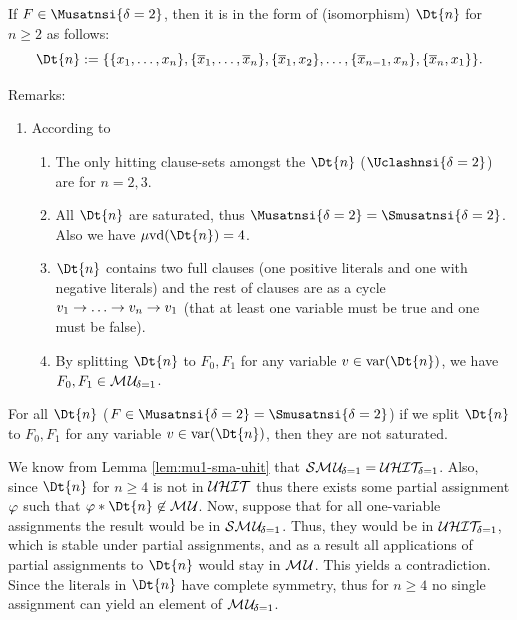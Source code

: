 \documentclass{report}
\begin{document}
\begin{lem}\label{lem:mu2-Fn}
\cite{h24} If $F \in \Musatnsi{\delta=2}$, then it is in the form of (isomorphism) $\Dt{n}$  for $n \ge 2$ as follows:
  \begin{displaymath}
    \Dt{n} := \set{\set{x_1,\dots,x_n},\set{\ol x_1,\dots,\ol x_n},\set{\ol x_1,x_2}, \dots, \set{\ol x_{n-1},x_n}, \set{\ol x_n,x_1}}.
  \end{displaymath}

\end{lem}
Remarks:
  \begin{enumerate}
  \item According to \cite{h9}
  \begin{enumerate}
  \item The only hitting clause-sets amongst the $\Dt{n}$ ($\Uclashnsi{\delta=2}$) are for $n=2,3$. 
  \item All $\Dt{n}$ are saturated, thus $\Musatnsi{\delta=2} = \Smusatnsi{\delta=2}$. Also we have $\minvdeg(\Dt{n}) = 4$. 
  \item $\Dt{n}$ contains two full clauses (one positive literals and one with negative literals) and the rest of clauses are as a cycle $v_1 \ra \dots \ra v_n \ra v_1$ (that at least one variable must be true and one must be false).
  \item By splitting $\Dt{n}$ to $F_0, F_1$ for any variable $v \in \var(\Dt{n})$, we have $F_0, F_1 \in \mathcal{M\hspace{0.8pt}U}_{\!\delta=1} $.
  \end{enumerate} 
  \end{enumerate} 
  
\begin{lem}\label{lem:mu2-smu2}
For all $\Dt{n}$ ($F \in \Musatnsi{\delta=2} = \Smusatnsi{\delta=2}$) if we split $\Dt{n}$ to $F_0, F_1$ for any variable $v \in \var(\Dt{n})$, then they are not saturated.
\end{lem}
\begin{prf}
We know from Lemma \ref{lem:mu1-sma-uhit} that $\mathcal{S}\mathcal{M\hspace{0.8pt}U}_{\!\delta=1} = \mathcal{U}\mathcal{HIT}_{\!\!\delta=1}$. Also, since $\Dt{n}$ for $n \ge 4$ is not in $\mathcal{U}\mathcal{HIT}$ thus there exists some partial assignment $\varphi$ such that $\vp * \Dt{n} \not \in \Musat$. Now, suppose that for all one-variable assignments the result would be in $\mathcal{S}\mathcal{M\hspace{0.8pt}U}_{\!\delta=1}$. Thus, they would be in $\mathcal{U}\mathcal{HIT}_{\!\!\delta=1}$, which is stable under partial assignments, and as a result all applications of partial assignments to $\Dt{n}$ would stay in $\mathcal{M\hspace{0.8pt}U}$. This yields a contradiction. Since  the literals in $\Dt{n}$ have complete symmetry, thus for $n \ge 4$ no single assignment can yield an element of $\mathcal{M\hspace{0.8pt}U}_{\!\delta=1}$.
\end{prf}
\end{document}
